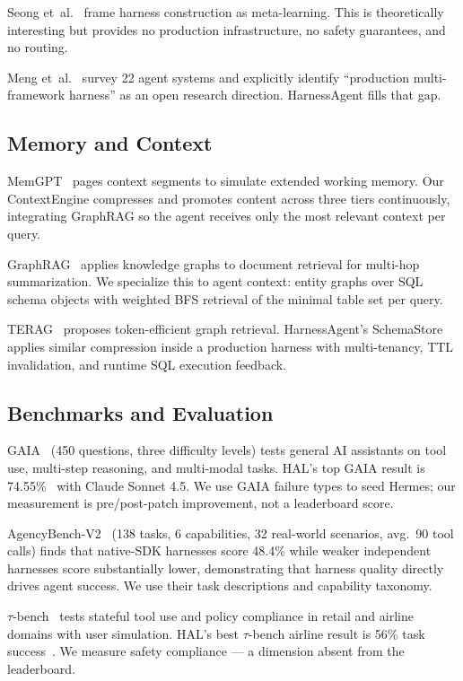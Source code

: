 \documentclass[conference]{IEEEtran}
\begin{document}
Seong et~al.~\cite{seong2026last} frame harness construction as
meta-learning. This is theoretically interesting but provides no
production infrastructure, no safety guarantees, and no routing.

Meng et~al.~\cite{meng2026survey} survey 22 agent systems and
explicitly identify ``production multi-framework harness'' as an open
research direction. HarnessAgent fills that gap.

\subsection{Memory and Context}

MemGPT~\cite{memgpt2023} pages context segments to simulate extended
working memory. Our ContextEngine compresses and promotes content across
three tiers continuously, integrating GraphRAG so the agent receives
only the most relevant context per query.

GraphRAG~\cite{graphrag2024} applies knowledge graphs to document
retrieval for multi-hop summarization. We specialize this to agent
context: entity graphs over SQL schema objects with weighted BFS
retrieval of the minimal table set per query.

TERAG~\cite{terag2025} proposes token-efficient graph retrieval.
HarnessAgent's SchemaStore applies similar compression inside a
production harness with multi-tenancy, TTL invalidation, and runtime
SQL execution feedback.

\subsection{Benchmarks and Evaluation}

GAIA~\cite{gaia2023} (450 questions, three difficulty levels) tests
general AI assistants on tool use, multi-step reasoning, and
multi-modal tasks. HAL's top GAIA result is 74.55\%~\cite{hal2025} with
Claude Sonnet 4.5. We use GAIA failure types to seed Hermes; our
measurement is pre/post-patch improvement, not a leaderboard score.

AgencyBench-V2~\cite{agencybench2026} (138 tasks, 6 capabilities,
32 real-world scenarios, avg.\ 90 tool calls) finds that native-SDK
harnesses score 48.4\% while weaker independent harnesses score
substantially lower, demonstrating that harness quality directly drives
agent success. We use their task descriptions and capability taxonomy.

$\tau$-bench~\cite{taubench2024} tests stateful tool use and policy
compliance in retail and airline domains with user simulation. HAL's
best $\tau$-bench airline result is 56\% task success~\cite{hal2025}.
We measure safety compliance — a dimension absent from the leaderboard.
\end{document}
